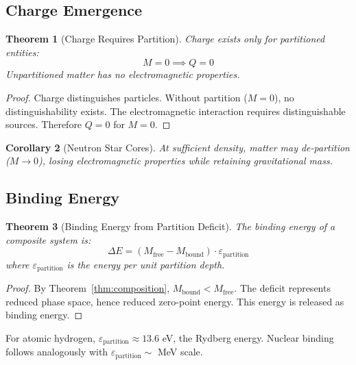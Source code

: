 \documentclass[twocolumn,amsmath,amssymb,aps,prl,superscriptaddress]{revtex4-2}
\newtheorem{theorem}{Theorem}[section]
\newtheorem{corollary}[theorem]{Corollary}
\newcommand{\Mpart}{M}
\begin{document}
\subsection{Charge Emergence}

\begin{theorem}[Charge Requires Partition]
\label{thm:charge}
Charge exists only for partitioned entities:
\begin{equation}
\boxed{\Mpart = 0 \implies Q = 0}
\end{equation}
Unpartitioned matter has no electromagnetic properties.
\end{theorem}

\begin{proof}
Charge distinguishes particles. Without partition ($\Mpart = 0$), no distinguishability exists. The electromagnetic interaction requires distinguishable sources. Therefore $Q = 0$ for $\Mpart = 0$.
\end{proof}

\begin{corollary}[Neutron Star Cores]
At sufficient density, matter may de-partition ($\Mpart \to 0$), losing electromagnetic properties while retaining gravitational mass.
\end{corollary}

\subsection{Binding Energy}

\begin{theorem}[Binding Energy from Partition Deficit]
\label{thm:binding}
The binding energy of a composite system is:
\begin{equation}
\boxed{\Delta E = (\Mpart_{\text{free}} - \Mpart_{\text{bound}}) \cdot \varepsilon_{\text{partition}}}
\end{equation}
where $\varepsilon_{\text{partition}}$ is the energy per unit partition depth.
\end{theorem}

\begin{proof}
By Theorem~\ref{thm:composition}, $\Mpart_{\text{bound}} < \Mpart_{\text{free}}$. The deficit represents reduced phase space, hence reduced zero-point energy. This energy is released as binding energy.
\end{proof}

For atomic hydrogen, $\varepsilon_{\text{partition}} \approx 13.6$ eV, the Rydberg energy. Nuclear binding follows analogously with $\varepsilon_{\text{partition}} \sim$ MeV scale.
\end{document}
